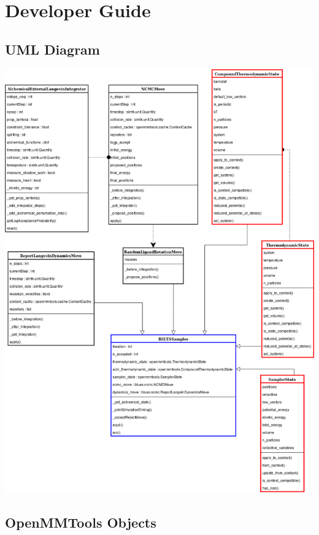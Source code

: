\hypertarget{developer-guide}{%
\section{Developer Guide}\label{developer-guide}}

\hypertarget{uml-diagram}{%
\subsection{UML Diagram}\label{uml-diagram}}

\includegraphics[width=\textwidth,height=\textheight,keepaspectratio]{blues-docs/images/uml.png}

\hypertarget{openmmtools-objects}{%
\subsection{OpenMMTools Objects}\label{openmmtools-objects}}


